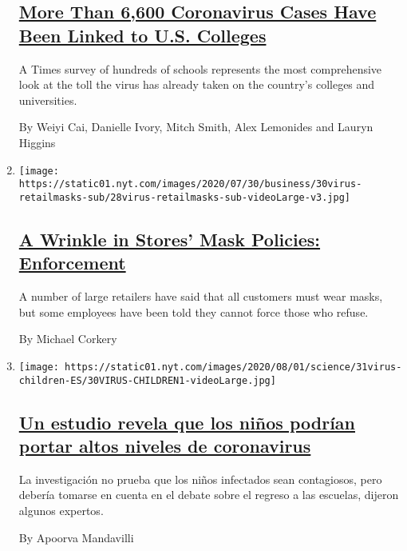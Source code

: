 \begin{enumerate}
{  \subsection{\texorpdfstring{\href{/interactive/2020/07/28/us/covid-19-colleges-universities.html}{More
  Than 6,600 Coronavirus Cases Have Been Linked to U.S.
  Colleges}}{More Than 6,600 Coronavirus Cases Have Been Linked to U.S. Colleges}}\label{more-than-6600-coronavirus-cases-have-been-linked-to-us-colleges}}

  A Times survey of hundreds of schools represents the most
  comprehensive look at the toll the virus has already taken on the
  country's colleges and universities.

  By Weiyi Cai, Danielle Ivory, Mitch Smith, Alex Lemonides and Lauryn
  Higgins
\item
  \texttt{[image: https://static01.nyt.com/images/2020/07/30/business/30virus-retailmasks-sub/28virus-retailmasks-sub-videoLarge-v3.jpg]}

  \hypertarget{a-wrinkle-in-stores-mask-policies-enforcement}{%
  \subsection{\texorpdfstring{\href{/2020/07/29/business/coronavirus-masks-stores-walmart.html}{A
  Wrinkle in Stores' Mask Policies:
  Enforcement}}{A Wrinkle in Stores' Mask Policies: Enforcement}}\label{a-wrinkle-in-stores-mask-policies-enforcement}}

  A number of large retailers have said that all customers must wear
  masks, but some employees have been told they cannot force those who
  refuse.

  By Michael Corkery
\item
  \texttt{[image: https://static01.nyt.com/images/2020/08/01/science/31virus-children-ES/30VIRUS-CHILDREN1-videoLarge.jpg]}

  \hypertarget{un-estudio-revela-que-los-niuxf1os-podruxedan-portar-altos-niveles-de-coronavirus}{%
  \subsection{\texorpdfstring{\href{/es/2020/07/31/espanol/ciencia-y-tecnologia/ninos-contagio-coronavirus.html}{Un
  estudio revela que los niños podrían portar altos niveles de
  coronavirus}}{Un estudio revela que los niños podrían portar altos niveles de coronavirus}}\label{un-estudio-revela-que-los-niuxf1os-podruxedan-portar-altos-niveles-de-coronavirus}}

  La investigación no prueba que los niños infectados sean contagiosos,
  pero debería tomarse en cuenta en el debate sobre el regreso a las
  escuelas, dijeron algunos expertos.

  By Apoorva Mandavilli
\end{enumerate}

